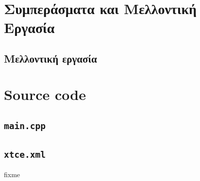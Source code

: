 \documentclass[a4paper,nobib]{tufte-book}
\begin{document}
\chapter{Συμπεράσματα και Μελλοντική Εργασία}
\label{cap:conclusion}


\section{Μελλοντική εργασία}

\appendix

\begin{fullwidth}
\printbibliography[heading=bibnumbered]
\end{fullwidth}


\printindex

\chapter{Source code}
\label{sec:source_code}



\section*{\texttt{main.cpp}}


\newpage
\section*{\texttt{xtce.xml}}
\label{app:xtce}

fixme


\end{document}
